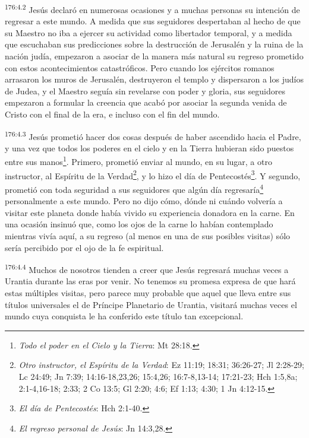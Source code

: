 \par 
\textsuperscript{176:4.2} Jesús declaró en numerosas ocasiones y a muchas personas su intención de regresar a este mundo. A medida que sus seguidores despertaban al hecho de que su Maestro no iba a ejercer su actividad como libertador temporal, y a medida que escuchaban sus predicciones sobre la destrucción de Jerusalén y la ruina de la nación judía, empezaron a asociar de la manera más natural su regreso prometido con estos acontecimientos catastróficos. Pero cuando los ejércitos romanos arrasaron los muros de Jerusalén, destruyeron el templo y dispersaron a los judíos de Judea, y el Maestro seguía sin revelarse con poder y gloria, sus seguidores empezaron a formular la creencia que acabó por asociar la segunda venida de Cristo con el final de la era, e incluso con el fin del mundo.

\par 
\textsuperscript{176:4.3} Jesús prometió hacer dos cosas después de haber ascendido hacia el Padre, y una vez que todos los poderes en el cielo y en la Tierra hubieran sido puestos entre sus manos\footnote{\textit{Todo el poder en el Cielo y la Tierra}: Mt 28:18.}. Primero, prometió enviar al mundo, en su lugar, a otro instructor, al Espíritu de la Verdad\footnote{\textit{Otro instructor, el Espíritu de la Verdad}: Ez 11:19; 18:31; 36:26-27; Jl 2:28-29; Lc 24:49; Jn 7:39; 14:16-18,23,26; 15:4,26; 16:7-8,13-14; 17:21-23; Hch 1:5,8a; 2:1-4,16-18; 2:33; 2 Co 13:5; Gl 2:20; 4:6; Ef 1:13; 4:30; 1 Jn 4:12-15.}, y lo hizo el día de Pentecostés\footnote{\textit{El día de Pentecostés}: Hch 2:1-40.}. Y segundo, prometió con toda seguridad a sus seguidores que algún día regresaría\footnote{\textit{El regreso personal de Jesús}: Jn 14:3,28.} personalmente a este mundo. Pero no dijo cómo, dónde ni cuándo volvería a visitar este planeta donde había vivido su experiencia donadora en la carne. En una ocasión insinuó que, como los ojos de la carne lo habían contemplado mientras vivía aquí, a su regreso (al menos en una de sus posibles visitas) sólo sería percibido por el ojo de la fe espiritual.

\par 
\textsuperscript{176:4.4} Muchos de nosotros tienden a creer que Jesús regresará muchas veces a Urantia durante las eras por venir. No tenemos su promesa expresa de que hará estas múltiples visitas, pero parece muy probable que aquel que lleva entre sus títulos universales el de Príncipe Planetario de Urantia, visitará muchas veces el mundo cuya conquista le ha conferido este título tan excepcional.

